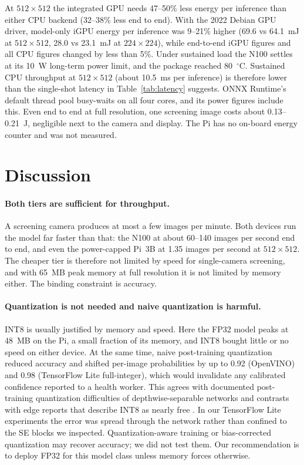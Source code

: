 \documentclass[a4paper,fleqn]{cas-sc}
\begin{document}
At $512\times512$ the integrated GPU needs 47--50\% less energy per
inference than either CPU backend (32--38\% less end to end). With the
2022 Debian GPU driver, model-only iGPU energy per inference was 9--21\%
higher (69.6 vs 64.1~mJ at $512\times512$, 28.0 vs 23.1~mJ at
$224\times224$), while end-to-end iGPU figures and all CPU figures changed
by less than 5\%. Under sustained load the N100 settles
at its 10~W long-term power limit, and the package reached 80~$^\circ$C.
Sustained CPU throughput at $512\times512$ (about 10.5~ms per inference)
is therefore lower than the single-shot latency in
Table~\ref{tab:latency} suggests. ONNX Runtime's default thread pool
busy-waits on all four cores, and its power figures include this. Even
end to end at full resolution, one screening image costs about 0.13--0.21~J,
negligible next to the camera and display. The Pi has no on-board energy
counter and was not measured.

\section{Discussion}
\label{sec:discussion}

\paragraph{Both tiers are sufficient for throughput.} A screening camera
produces at most a few images per minute. Both devices run the model
far faster than that: the N100 at about 60--140 images per
second end to end, and even the power-capped Pi~3B at 1.35 images per
second at $512\times512$. The cheaper tier is therefore not limited by speed for single-camera
screening, and with 65~MB peak memory at full resolution it is not
limited by memory either. The binding constraint is accuracy.

\paragraph{Quantization is not needed and naive quantization is harmful.}
INT8 is usually justified by memory and speed. Here the FP32 model peaks at
48~MB on the Pi, a small fraction of its memory, and INT8 bought little or
no speed on either device. At the same time, naive post-training
quantization reduced accuracy and shifted per-image probabilities by up to
0.92 (OpenVINO) and 0.98 (TensorFlow Lite full-integer), which would
invalidate any calibrated confidence reported to a health worker. This
agrees with documented post-training quantization difficulties of
depthwise-separable networks \cite{yun2021mobilenets,sheng2018quantization}
and contrasts with edge reports that describe INT8 as nearly free
\cite{nief2025highly}. In our TensorFlow Lite experiments the error was
spread through the network rather than confined to the SE blocks we
inspected. Quantization-aware training or bias-corrected quantization
\cite{jacob2018quantization,nagel2019datafree} may recover accuracy; we did
not test them. Our recommendation is to deploy FP32 for this model class
unless memory forces otherwise.
\end{document}
